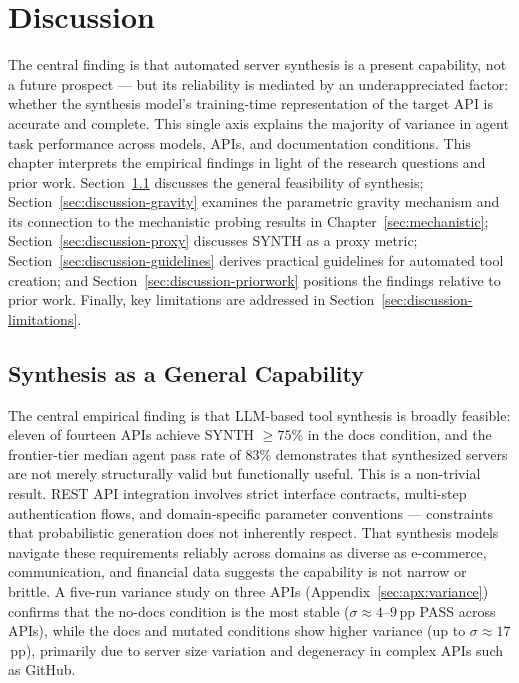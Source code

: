 \chapter{Discussion}
\label{sec:discussion}

The central finding is that automated server synthesis is a present capability, not a future prospect --- but its reliability is mediated by an underappreciated factor: whether the synthesis model's training-time representation of the target API is accurate and complete. This single axis explains the majority of variance in agent task performance across models, APIs, and documentation conditions. This chapter interprets the empirical findings in light of the research questions and prior work. Section~\ref{sec:discussion-synthesis} discusses the general feasibility of synthesis; Section~\ref{sec:discussion-gravity} examines the parametric gravity mechanism and its connection to the mechanistic probing results in Chapter~\ref{sec:mechanistic}; Section~\ref{sec:discussion-proxy} discusses SYNTH as a proxy metric; Section~\ref{sec:discussion-guidelines} derives practical guidelines for automated tool creation; and Section~\ref{sec:discussion-priorwork} positions the findings relative to prior work. Finally, key limitations are addressed in Section~\ref{sec:discussion-limitations}.

\section{Synthesis as a General Capability}
\label{sec:discussion-synthesis}

The central empirical finding is that LLM-based tool synthesis is broadly feasible: eleven of fourteen APIs achieve SYNTH $\geq 75\%$ in the docs condition, and the frontier-tier median agent pass rate of 83\% demonstrates that synthesized servers are not merely structurally valid but functionally useful. This is a non-trivial result. REST API integration involves strict interface contracts, multi-step authentication flows, and domain-specific
parameter conventions --- constraints that probabilistic generation does not inherently respect. That synthesis models navigate these requirements reliably across domains as diverse as e-commerce, communication, and financial data suggests the capability is not narrow or brittle. A five-run variance study on three APIs (Appendix~\ref{sec:apx:variance}) confirms that the no-docs condition is the most stable ($\sigma \approx 4$--$9$\,pp PASS across APIs), while the docs and mutated conditions show higher variance (up to $\sigma \approx 17$\,pp), primarily due to server size variation and degeneracy in complex APIs such as GitHub.


